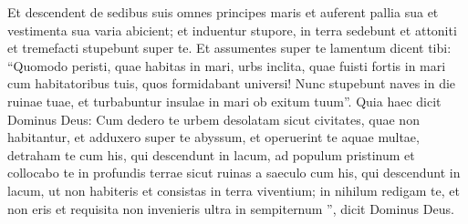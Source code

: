 \begin{biblechapter}
\begin{biblechapter}
\begin{biblechapter}
\begin{biblechapter}
\begin{biblechapter}
\begin{biblechapter}
\begin{biblechapter}
\begin{biblechapter}
\begin{biblechapter}
\begin{biblechapter}
\begin{biblechapter}
\begin{biblechapter}
\begin{biblechapter}
\begin{biblechapter}
\begin{biblechapter}
\begin{biblechapter}
\begin{biblechapter}
\begin{biblechapter}
\begin{biblechapter}
\begin{biblechapter}
\begin{biblechapter}
\begin{biblechapter}
\begin{biblechapter}
\begin{biblechapter}
\begin{biblechapter}
\begin{biblechapter}
 \verse Et descendent de sedibus suis omnes principes maris et auferent pallia sua et vestimenta sua varia abicient; et induentur stupore, in terra sedebunt et attoniti et tremefacti stupebunt super te. 
\verse Et assumentes super te lamentum dicent tibi:
 “Quomodo peristi, quae habitas in mari,
 urbs inclita,
 quae fuisti fortis in mari
 cum habitatoribus tuis,
 quos formidabant universi!
 \verse Nunc stupebunt naves
 in die ruinae tuae,
 et turbabuntur insulae in mari
 ob exitum tuum”.
 \verse Quia haec dicit Dominus Deus: Cum dedero te urbem desolatam sicut civitates, quae non habitantur, et adduxero super te abyssum, et operuerint te aquae multae, 
\verse detraham te cum his, qui descendunt in lacum, ad populum pristinum et collocabo te in profundis terrae sicut ruinas a saeculo cum his, qui descendunt in lacum, ut non habiteris et consistas in terra viventium; 
 \verse in nihilum redigam te, et non eris et requisita non invenieris ultra in sempiternum ”, dicit Dominus Deus.
 

\end{biblechapter}
\end{biblechapter}
\end{biblechapter}
\end{biblechapter}
\end{biblechapter}
\end{biblechapter}
\end{biblechapter}
\end{biblechapter}
\end{biblechapter}
\end{biblechapter}
\end{biblechapter}
\end{biblechapter}
\end{biblechapter}
\end{biblechapter}
\end{biblechapter}
\end{biblechapter}
\end{biblechapter}
\end{biblechapter}
\end{biblechapter}
\end{biblechapter}
\end{biblechapter}
\end{biblechapter}
\end{biblechapter}
\end{biblechapter}
\end{biblechapter}
\end{biblechapter}
